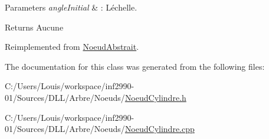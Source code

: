 \begin{DoxyParams}{Parameters}
{\em angle\+Initial} & \+: L\textquotesingle{}échelle.\\
\hline
\end{DoxyParams}
\begin{DoxyReturn}{Returns}
Aucune 
\end{DoxyReturn}


Reimplemented from \hyperlink{group__inf2990_gaef8fd99796f85418adac496160a3350b}{Noeud\+Abstrait}.



The documentation for this class was generated from the following files\+:\begin{DoxyCompactItemize}
\item 
C\+:/\+Users/\+Louis/workspace/inf2990-\/01/\+Sources/\+D\+L\+L/\+Arbre/\+Noeuds/\hyperlink{_noeud_cylindre_8h}{Noeud\+Cylindre.\+h}\item 
C\+:/\+Users/\+Louis/workspace/inf2990-\/01/\+Sources/\+D\+L\+L/\+Arbre/\+Noeuds/\hyperlink{_noeud_cylindre_8cpp}{Noeud\+Cylindre.\+cpp}\end{DoxyCompactItemize}
